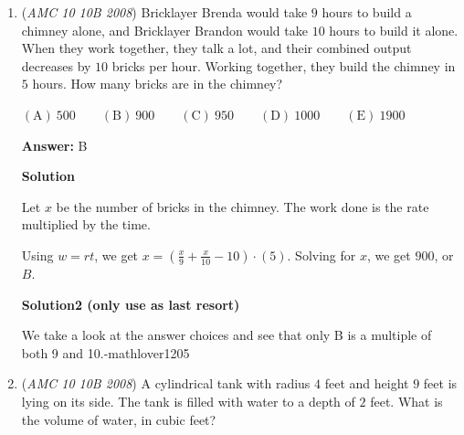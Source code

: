 \begin{enumerate}
\textbf{Solution 2}

In more concise terms, this problem is an extension of the binomial distribution. We find the number of ways only 1 person approves of the mayor multiplied by the probability 1 person approves and 2 people disapprove: ${3\choose 1} \cdot(0.7)^1\cdot(1-0.7)^{(3-1)}=3\cdot0.7\cdot0.09=\boxed{\mathrm{(B)}\ {{{0.189}}}}$




\textbf{Solution 3 (combinatorics)}

The probability of getting the first voter to approve is $\frac{7}{10} * \frac{3}{10} * \frac{3}{10}$.

 This first voter, using combinations, can be arranged in 3 choose 1 ways, which simplifies into 3 ways.

 Multiplying $3$ by $\frac{7}{10} * \frac{3}{10} * \frac{3}{10}$ gives (B).

 PS: For a more challenging practice problem akin to this one, look to 2012 AMC 12A Problem 11.

 


	\item (\textit{AMC 10 10B 2008}) Bricklayer Brenda would take $9$ hours to build a chimney alone, and Bricklayer Brandon would take $10$ hours to build it alone. When they work together, they talk a lot, and their combined output decreases by $10$ bricks per hour. Working together, they build the chimney in $5$ hours. How many bricks are in the chimney?


 $\mathrm{(A)}\ 500\qquad\mathrm{(B)}\ 900\qquad\mathrm{(C)}\ 950\qquad\mathrm{(D)}\ 1000\qquad\mathrm{(E)}\ 1900$

 \textbf{Answer: }B



\textbf{Solution}

Let $x$ be the number of bricks in the chimney. The work done is the rate multiplied by the time. 

 Using $w = rt$, we get $x = \left(\frac{x}{9} + \frac{x}{10} - 10\right)\cdot(5)$. Solving for $x$, we get $900$, or $\boxed{B}$.

 



\textbf{Solution2 (only use as last resort)}

We take a look at the answer choices and see that only B is a multiple of both 9 and 10.-mathlover1205

 


	\item (\textit{AMC 10 10B 2008}) A cylindrical tank with radius $4$ feet and height $9$ feet is lying on its side. The tank is filled with water to a depth of $2$ feet. What is the volume of water, in cubic feet?



\end{enumerate}
